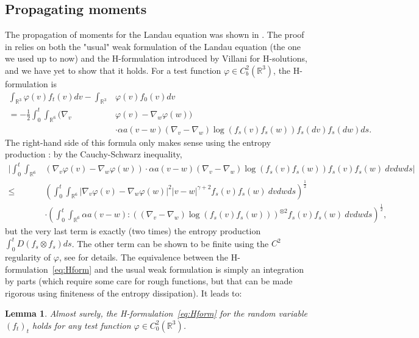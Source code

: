 \documentclass[11pt,a4paper]{article}
\theoremstyle{definition}
\theoremstyle{plain}
\newtheorem{lemma}[defi]{Lemma}
\begin{document}
\subsection{Propagating moments}

The propagation of moments for the Landau equation was shown in \cite{Desvillettes2014a, CarrapatosoDesvillettesHe2015}. The proof in \cite{CarrapatosoDesvillettesHe2015} relies on both the "usual" weak formulation of the Landau equation (the one we used up to now) and the H-formulation introduced by Villani \cite{Villani1998} for H-solutions, and we have yet to show that it holds. For a test function $\varphi\in C^2_b(\mathbb{R}^3)$, the H-formulation is
\begin{align}
    \label{eq:Hform}
     \int_{\mathbb{R}^3} \varphi(v) f_t(v)dv-\int_{\mathbb{R}^3} &\varphi(v) f_0(v) dv\nonumber\\
     = -\frac{1}{2}
     \int_0^t \int_{\mathbb{R}^6}  (\nabla_v&\varphi(v) - \nabla_w\varphi(w))\\
     &\cdot \alpha a(v-w) (\nabla_v - \nabla_w)\log(f_s(v)f_s(w)) f_s(dv) f_s(dw)ds.\nonumber
\end{align}
The right-hand side of this formula only makes sense using the entropy production \cite{Villani1998}: 
by the Cauchy-Schwarz inequality,
\begin{align*}
    \bigg\vert \int_0^t \int_{\mathbb{R}^6} &(\nabla_v\varphi(v) - \nabla_w\varphi(w))\cdot \alpha a(v-w) (\nabla_v - \nabla_w)\log(f_s(v)f_s(w))f_s(v) f_s(w)\ dvdwds
    \bigg\vert \\\leq& \left(\int_0^t \int_{\mathbb{R}^6} \vert \nabla_v\varphi(v) - \nabla_w\varphi(w)\vert^2 \vert v-w\vert^{\gamma+2} f_s(v) f_s(w)\ dvdwds \right)^\frac{1}{2}\\
    &\cdot\left(\int_0^t \int_{\mathbb{R}^6}\alpha a(v-w): \left((\nabla_v - \nabla_w)\log(f_s(v) f_s(w))\right)^{\otimes 2} f_s(v) f_s(w)\ dvdwds \right)^\frac{1}{2},
\end{align*}
but the very last term is exactly (two times) the entropy production $\int_0^t D(f_s \otimes f_s)ds$. The other term can be shown to be finite using the $C^2$ regularity of $\varphi$, see \cite[Equation (42)]{Villani1998} for details. The equivalence between the H-formulation~\eqref{eq:Hform} and the usual weak formulation is simply an integration by parts (which require some care for rough functions, but that can be made rigorous using finiteness of the entropy dissipation). It leads to:
\begin{lemma}
    \label{lem:ashsol}
    Almost surely, the H-formulation~\eqref{eq:Hform} for the random variable $(f_t)_t$ holds for any test function $\varphi\in C^2_0(\mathbb{R}^3)$.
\end{lemma}
\end{document}
